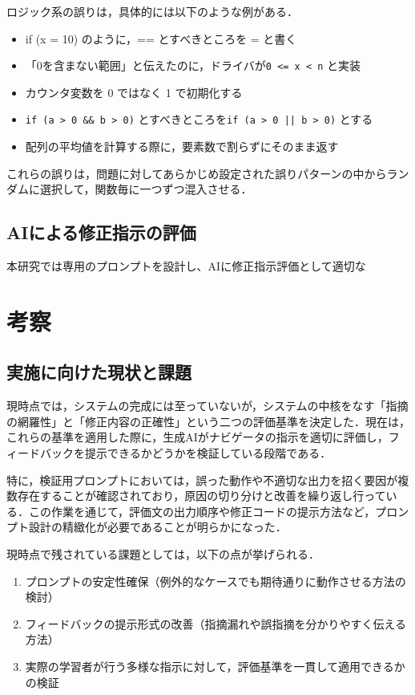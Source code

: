 \documentclass[twoside,twocolumn,10pt]{jsarticle}
\begin{document}
ロジック系の誤りは，具体的には以下のような例がある．

\begin{itemize}
        \item if (x = 10) のように，== とすべきところを = と書く
        \item 「0を含まない範囲」と伝えたのに，ドライバが\texttt{0 <= x < n} と実装
        \item カウンタ変数を 0 ではなく 1 で初期化する
        \item \texttt{if (a > 0 \&\& b > 0)} とすべきところを\texttt{if (a > 0 || b > 0)} とする
        \item 配列の平均値を計算する際に，要素数で割らずにそのまま返す
\end{itemize}

これらの誤りは，問題に対してあらかじめ設定された誤りパターンの中からランダムに選択して，関数毎に一つずつ混入させる．

\subsection{AIによる修正指示の評価}
本研究では専用のプロンプトを設計し、AIに修正指示評価として適切な

\section{考察}\label{考察}

\subsection{実施に向けた現状と課題}
現時点では，システムの完成には至っていないが，システムの中核をなす「指摘の網羅性」と「修正内容の正確性」という二つの評価基準を決定した．現在は，これらの基準を適用した際に，生成AIがナビゲータの指示を適切に評価し，フィードバックを提示できるかどうかを検証している段階である．

特に，検証用プロンプトにおいては，誤った動作や不適切な出力を招く要因が複数存在することが確認されており，原因の切り分けと改善を繰り返し行っている．この作業を通じて，評価文の出力順序や修正コードの提示方法など，プロンプト設計の精緻化が必要であることが明らかになった．

現時点で残されている課題としては，以下の点が挙げられる．

\begin{enumerate}
    \item プロンプトの安定性確保（例外的なケースでも期待通りに動作させる方法の検討）
    \item フィードバックの提示形式の改善（指摘漏れや誤指摘を分かりやすく伝える方法）
    \item 実際の学習者が行う多様な指示に対して，評価基準を一貫して適用できるかの検証
\end{enumerate}
\end{document}
